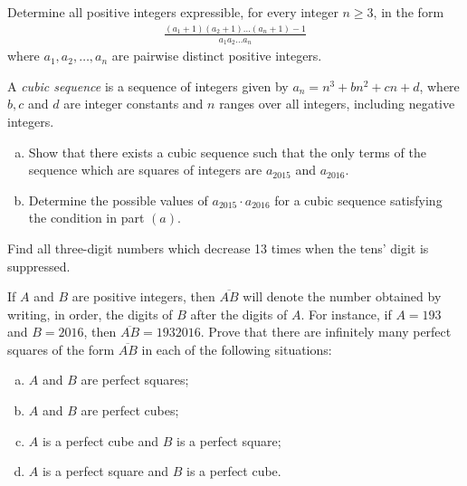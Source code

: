 \begin{problem}
	Determine all positive integers expressible, for every integer $n \geq 3$,
	in the form
		\begin{align*}
			\frac{(a_1 + 1)(a_2 + 1) \dots (a_n + 1) - 1}{a_1a_2\dots a_n}
		\end{align*}
	where $a_1, a_2, \dots, a_n$ are pairwise distinct positive integers.
\end{problem}



\begin{problem}
	A \textit{cubic sequence} is a sequence of integers given by $a_n =n^3 + bn^2 + cn + d$, where $b, c$ and $d$ are integer constants and $n$ ranges over all integers, including negative integers.
	\begin{enumerate}[(a)]
		\item Show that there exists a cubic sequence such that the only terms
		of the sequence which are squares of integers are $a_{2015}$ and $a_{2016}$.
		\item Determine the possible values of $a_{2015} \cdot a_{2016}$ for a cubic sequence
		satisfying the condition in part $(a)$.
	\end{enumerate}
\end{problem}


\begin{problem}
	Find all three-digit numbers which decrease 13 times when the tens'	digit is suppressed.
\end{problem}


\begin{problem}
	If $A$ and $B$ are positive integers, then $\overline{AB}$ will denote the number obtained by writing, in order, the digits of $B$ after the digits of $A$. For instance, if $A = 193$ and $B = 2016$, then $\overline{AB} = 1932016$.
	Prove that there are infinitely many perfect squares of the form $\overline{AB}$ in each of the following situations:
	\begin{enumerate}[(a)]
		\item $A$ and $B$ are perfect squares;
		\item $A$ and $B$ are perfect cubes;
		\item $A$ is a perfect cube and $B$ is a perfect square;
		\item $A$ is a perfect square and $B$ is a perfect cube.
	\end{enumerate}
\end{problem}

